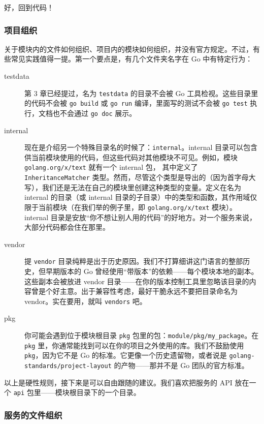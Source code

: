 好，回到代码！

\subsubsection*{项目组织}

关于模块内的文件如何组织、项目内的模块如何组织，并没有官方规定。不过，有些常见实践值得一提。第一个要点是，有几个文件夹名字在 Go 中有特定行为：

\begin{description}
  \item[testdata] 第 3 章已经提过，名为 \texttt{testdata} 的目录不会被 Go 工具检视。这些目录里的代码不会被 \texttt{go build} 或 \texttt{go run} 编译，里面写的测试不会被 \texttt{go test} 执行，文档也不会通过 \texttt{go doc} 展示。
  \item[internal] 现在是介绍另一个特殊目录名的时候了：\texttt{internal}。internal 目录可以包含供当前模块使用的代码，但这些代码对其他模块不可见。例如，模块 \texttt{golang.org/x/text} 就有一个 internal 包，
其中定义了 \texttt{InheritanceMatcher} 类型。然而，尽管这个类型是导出的（因为首字母大写），我们还是无法在自己的模块里创建这种类型的变量。定义在名为 internal 的目录（或 internal 目录的子目录）中的类型和函数，其作用域仅限于当前模块（在我们举的例子里，即 \texttt{golang.org/x/text} 模块）。internal 目录是安放``你不想让别人用的代码''的好地方。对一个服务来说，大部分代码都会住在那里。

\item[vendor] 提 \texttt{vendor} 目录纯粹是出于历史原因。我们不打算细讲这门语言的整部历史，但早期版本的 Go 曾经使用``带版本''的依赖——每个模块本地的副本。这些副本会被放进 vendor 目录——在你的版本控制工具里忽略该目录的内容曾是个好主意。出于兼容性考虑，最好干脆永远不要把目录命名为 vendor。实在要用，就叫 \texttt{vendors} 吧。

\item[pkg] 你可能会遇到位于模块根目录 \texttt{pkg} 包里的包：\texttt{module/pkg/my\_package}。在 \texttt{pkg} 里，你通常能找到可以在你的项目之外使用的库。我们不鼓励使用 \texttt{pkg}，因为它不是 Go 的标准。它更像一个历史遗留物，或者说是 \texttt{golang-standards/project-layout} 的产物——那并不是 Go 团队的官方标准。
\end{description}

以上是硬性规则，接下来是可以自由跟随的建议。我们喜欢把服务的 API 放在一个 \texttt{api} 包里——模块根目录下的一个目录。

\subsubsection*{服务的文件组织}

